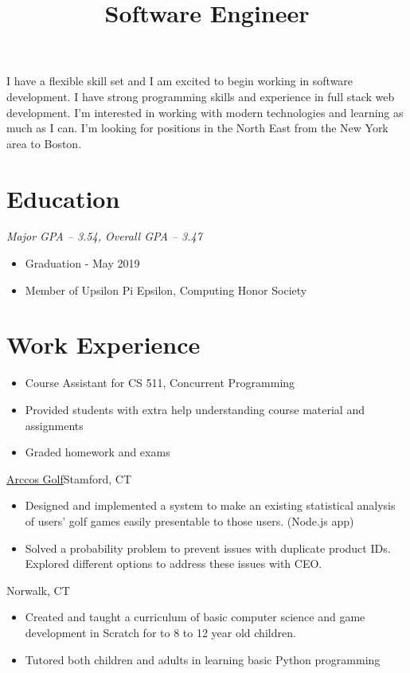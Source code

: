 \documentclass[11pt,letterpaper,roman]{moderncv}
\title{Software Engineer}
\begin{document}
\makecvtitle
\vspace*{-7mm}


{
    I have a flexible skill set and I am excited to begin working in software development.
    I have strong programming skills and experience in full stack web development. 
    I'm interested in working with modern technologies and learning as much as I can. 
    I'm looking for positions in the North East from the New York area to Boston.
}

\section{Education}
{
    \textit{Major GPA -- 3.54, Overall GPA -- 3.47}
    \begin{itemize}
        \item Graduation - May 2019
        \item Member of Upsilon Pi Epsilon, Computing Honor Society
    \end{itemize}
}

\section{Work Experience}
{
    \begin{itemize}
        \item Course Assistant for CS 511, Concurrent Programming
        \item Provided students with extra help understanding course material and assignments
        \item Graded homework and exams
    \end{itemize}
}
{\href{http://www.arccosgolf.com/}{Arccos Golf}}{Stamford, CT}{}
{
    \begin{itemize}
        \item Designed and implemented a system to make an existing statistical analysis of users'
              golf games easily presentable to those users. (Node.js app)
        \item Solved a probability problem to prevent issues with duplicate product IDs.
              Explored different options to address these issues with CEO.
    \end{itemize}
}
{Norwalk, CT}{}
{
    \begin{itemize}
        \item Created and taught a curriculum of basic computer science and game development in
              Scratch for to 8 to 12 year old children.
        \item Tutored both children and adults in learning basic Python programming
    \end{itemize}
}
\end{document}
